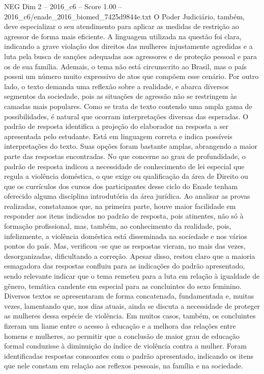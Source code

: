 \begin{textsample}{NEG Dim 2 – 2016\_c6 – Score 1.00 – 2016\_c6/enade\_2016\_biomed\_7425d9844e.txt}
O Poder Judiciário, também, deve especializar o seu atendimento para aplicar as medidas de restrição ao agressor de forma mais eficiente.
A linguagem utilizada na questão foi clara, indicando a grave violação dos direitos das mulheres injustamente agredidas e a luta pela busca de sanções adequadas aos agressores e de proteção pessoal e para os de sua família.
Ademais, o tema não está circunscrito ao Brasil, mas o país possui um número muito expressivo de atos que compõem esse cenário.
Por outro lado, o texto demanda uma reflexão sobre a realidade, e abarca diversos segmentos da sociedade, pois as situações de agressão não se restringem às camadas mais populares.
Como se trata de texto contendo uma ampla gama de possibilidades, é natural que ocorram interpretações diversas das esperadas.
O padrão de resposta identifica a projeção do elaborador na resposta a ser apresentada pelo estudante.
Está em linguagem correta e indica possíveis interpretações do texto.
Suas opções foram bastante amplas, abrangendo a maior parte das respostas encontradas.
No que concerne ao grau de profundidade, o padrão de resposta indicou a necessidade de conhecimento de lei especial que regula a violência doméstica, o que exige ou qualificação da área de Direito ou que os currículos dos cursos dos participantes desse ciclo do Enade tenham oferecido alguma disciplina introdutória da área jurídica.
Ao analisar as provas realizadas, constatamos que, na primeira parte, houve maior facilidade em responder aos itens indicados no padrão de resposta, pois atinentes, não só à formação profissional, mas, também, ao conhecimento da realidade, pois, infelizmente, a violência doméstica está disseminada na sociedade e nos vários pontos do país.
Mas, verificou -se que as respostas vieram, no mais das vezes, desorganizadas, dificultando a correção.
Apesar disso, restou claro que a maioria esmagadora das respostas confluiu para as indicações do padrão apresentado, sendo relevante indicar que o tema remeteu para a luta em relação à igualdade de gênero, temática candente em especial para as concluintes do sexo feminino.
Diversos textos se apresentaram de forma concatenada, fundamentada e, muitas vezes, lamentando que, nos dias atuais, ainda se discuta a necessidade de proteger as mulheres dessa espécie de violência.
Em muitos casos, também, os concluintes fizeram um liame entre o acesso à educação e a melhora das relações entre homens e mulheres, ao permitir que a conclusão de maior grau de educação formal conduzisse à diminuição do índice de violência contra a mulher.
Foram identificadas respostas consoantes com o padrão apresentado, indicando os itens que nele constam em relação aos reflexos pessoais, na família e na sociedade.

\end{textsample}
